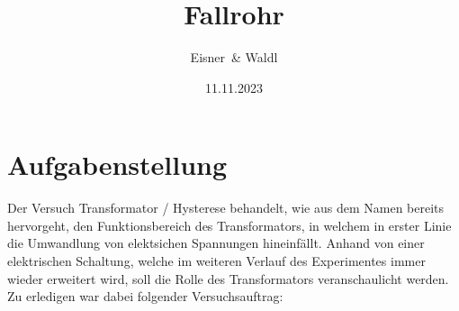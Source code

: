 \documentclass[12pt,a4paper,twoside]{article}
\begin{document}
\newcommand\laboratorynumber{2}
\title{Fallrohr}
\newcommand\supervisor{Ditlbacher, Harald}
\newcommand\groupnumber{42}

\newcommand\participantonelastname{Eisner}
\newcommand\participantonefirstname{Nico}
\newcommand\participantoneid{12214121}
\newcommand\participanttwolastname{Waldl}
\newcommand\participanttwofirstname{Philip}
\newcommand\participanttwoid{12214120}
\author{\participantonelastname \ \& \participanttwolastname}

\newcommand\degreeid{UB 033 678}
\newcommand\semester{23WS}
\date{11.11.2023}

\newcommand\coursetitle{Laborübungen 2: \\ Elektrizität, Magnetismus, Optik}

%



\tableofcontents
\newpage

\section{Aufgabenstellung} %
Der Versuch Transformator / Hysterese behandelt, wie aus dem Namen bereits hervorgeht, den Funktionsbereich des Transformators, in welchem in erster Linie die Umwandlung von elektsichen Spannungen hineinfällt.
Anhand von einer elektrischen Schaltung, welche im weiteren Verlauf des Experimentes immer wieder erweitert wird, soll die Rolle des Transformators veranschaulicht werden.
Zu erledigen war dabei folgender Versuchsauftrag:
\end{document}
